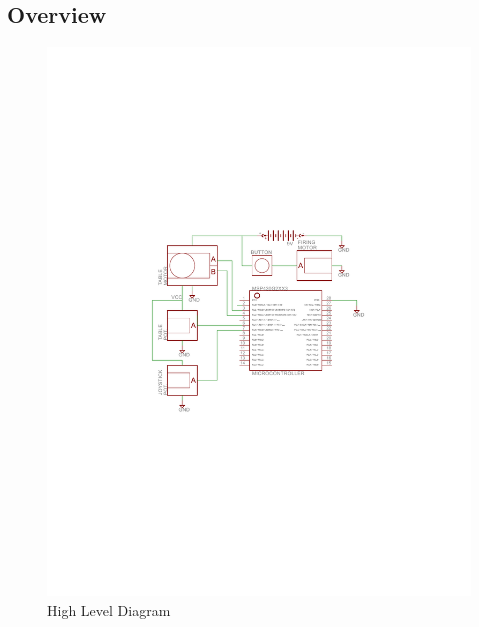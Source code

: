 \documentclass[a4paper, 11pt]{article}
\begin{document}
	\subsection{Overview}
	\begin{figure}[!ht]
		\centering
		\vspace{-9cm}
		\includegraphics{report-images/high-level-diagram}
		\vspace{-9.5cm}
		\caption{High Level Diagram}
	\end{figure}

\newpage
\end{document}
